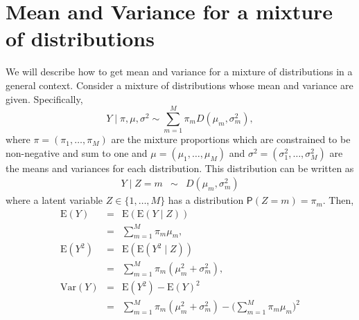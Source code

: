 \documentclass[12pt,letterpaper]{article}
\renewcommand{\Pr}{\mathsf{P}}
\newcommand{\given}{\mid}
\newcommand{\var}{\mathrm{Var}}
\newcommand{\mean}{\mathrm{E}}
\begin{document}
\section{Mean and Variance for a mixture of distributions}
\label{sec:mean_var_mixture}
We will describe how to get mean and variance for a mixture of distributions in a general context.
Consider a mixture of distributions whose mean and variance are given. Specifically,
\begin{equation}
Y \given \pi, \mu, \sigma^2 \sim \sum_{m=1}^M \pi_mD(\mu_m, \sigma^2_m),
\end{equation}
where $\pi = (\pi_1, \ldots, \pi_M)$ are the mixture proportions which are constrained to be non-negative and sum to one and $\mu = (\mu_1, \ldots, \mu_M)$ and $\sigma^2 = (\sigma^2_1, \ldots, \sigma^2_M)$ are the means and variances for each distribution.
This distribution can be written as
\begin{eqnarray}
Y \given Z=m &\sim& D(\mu_m, \sigma^2_m)
\end{eqnarray}
where a latent variable $Z \in \{1, \ldots, M\}$ has a distribution $\Pr(Z = m) = \pi_m$.
Then,
\begin{eqnarray}
\mean(Y) &=& \mean(\mean(Y \given Z)) \\
	        &=& \sum_{m=1}^M \pi_m \mu_m,\\
\mean(Y^2) &=&  \mean(\mean(Y^2 \given Z)) \\
	        &=& \sum_{m=1}^M \pi_m (\mu_m^2 + \sigma_m^2), \\
\var(Y)  &=& \mean(Y^2) - \mean(Y)^2  \\
        &=& \sum_{m=1}^M \pi_m (\mu_m^2 + \sigma_m^2) - \big(\sum_{m=1}^M \pi_m \mu_m\big)^2
\end{eqnarray}









\end{document}
